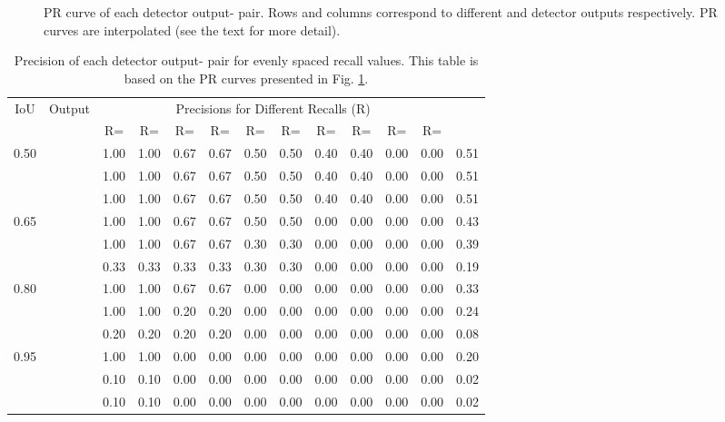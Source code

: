 \documentclass{article}
\begin{document}
\begin{figure}
\caption{PR curve of each detector output- pair. Rows and columns correspond to different  and detector outputs respectively. PR curves are interpolated (see the text for more detail).}
\label{fig:pr_curves}
\end{figure}



\begin{table}[t]

    \centering
    \caption{Precision of each detector output- pair for evenly spaced recall values. This table is based on the PR curves presented in Fig. \ref{fig:pr_curves}.}
    \label{tab:perf_calculation}
    \setlength{\tabcolsep}{0.25em}
    \begin{tabular}{|c|c|c|c|c|c|c|c|c|c|c|c|c|} \hline
         \multirow{2}{*}{IoU}&\multirow{2}{*}{Output}&\multicolumn{10}{|c|}{Precisions for Different Recalls (R)}&\multirow{2}{*}{}\\ \cline{3-12}
         & &R=&R=&R=&R=&R=&R=&R=&R=&R=&R=& \\ \hline\hline
         \multirow{3}{*}{0.50}
         &&1.00&1.00&0.67&0.67&0.50&0.50&0.40&0.40&0.00&0.00&0.51\\
         &&1.00&1.00&0.67&0.67&0.50&0.50&0.40&0.40&0.00&0.00&0.51\\
         &&1.00&1.00&0.67&0.67&0.50&0.50&0.40&0.40&0.00&0.00&0.51\\
         \hline
         \multirow{3}{*}{0.65}
         &&1.00&1.00&0.67&0.67&0.50&0.50&0.00&0.00&0.00&0.00&0.43\\
         &&1.00&1.00&0.67&0.67&0.30&0.30&0.00&0.00&0.00&0.00&0.39\\
         &&0.33&0.33&0.33&0.33&0.30&0.30&0.00&0.00&0.00&0.00&0.19\\
         \hline
         \multirow{3}{*}{0.80}
         &&1.00&1.00&0.67&0.67&0.00&0.00&0.00&0.00&0.00&0.00&0.33\\
         &&1.00&1.00&0.20&0.20&0.00&0.00&0.00&0.00&0.00&0.00&0.24\\
         &&0.20&0.20&0.20&0.20&0.00&0.00&0.00&0.00&0.00&0.00&0.08\\
         \hline
         \multirow{3}{*}{0.95}
         &&1.00&1.00&0.00&0.00&0.00&0.00&0.00&0.00&0.00&0.00&0.20\\
         &&0.10&0.10&0.00&0.00&0.00&0.00&0.00&0.00&0.00&0.00&0.02\\
         &&0.10&0.10&0.00&0.00&0.00&0.00&0.00&0.00&0.00&0.00&0.02 \\
         \hline
    \end{tabular}
\end{table}
\end{document}

